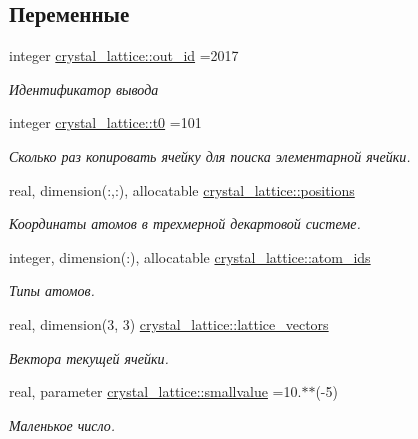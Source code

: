 \subsection*{Переменные}
\begin{DoxyCompactItemize}
\item 
integer \mbox{\hyperlink{namespacecrystal__lattice_a297a8f77c70b997ba6967443326cd549}{crystal\+\_\+lattice\+::out\+\_\+id}} =2017
\begin{DoxyCompactList}\small\item\em Идентификатор вывода \end{DoxyCompactList}\item 
integer \mbox{\hyperlink{namespacecrystal__lattice_a8ff442188723d34f67cad873e47bb5ad}{crystal\+\_\+lattice\+::t0}} =101
\begin{DoxyCompactList}\small\item\em Сколько раз копировать ячейку для поиска элементарной ячейки. \end{DoxyCompactList}\item 
real, dimension(\+:,\+:), allocatable \mbox{\hyperlink{namespacecrystal__lattice_a65687f01a2e1edcce4350543b69ef312}{crystal\+\_\+lattice\+::positions}}
\begin{DoxyCompactList}\small\item\em Координаты атомов в трехмерной декартовой системе. \end{DoxyCompactList}\item 
integer, dimension(\+:), allocatable \mbox{\hyperlink{namespacecrystal__lattice_adf237967e114c0d9d219fdd66a5e40d0}{crystal\+\_\+lattice\+::atom\+\_\+ids}}
\begin{DoxyCompactList}\small\item\em Типы атомов. \end{DoxyCompactList}\item 
real, dimension(3, 3) \mbox{\hyperlink{namespacecrystal__lattice_a241136293ff688704ae81d069144f5ea}{crystal\+\_\+lattice\+::lattice\+\_\+vectors}}
\begin{DoxyCompactList}\small\item\em Вектора текущей ячейки. \end{DoxyCompactList}\item 
real, parameter \mbox{\hyperlink{namespacecrystal__lattice_ac13001be81194a82292d9ca561b000d3}{crystal\+\_\+lattice\+::smallvalue}} =10.$\ast$$\ast$(-\/5)
\begin{DoxyCompactList}\small\item\em Маленькое число. \end{DoxyCompactList}\item 
$$
\end{DoxyCompactItemize}
